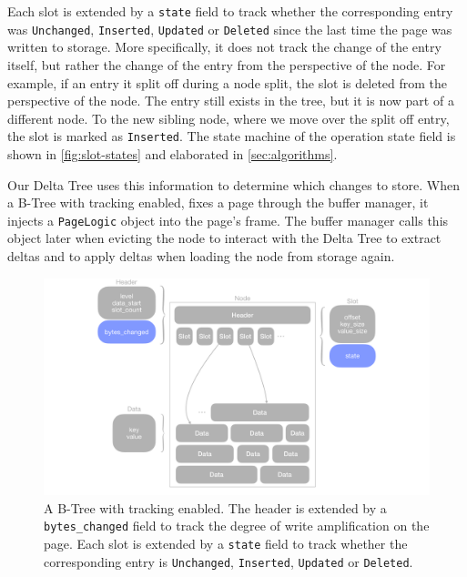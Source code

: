 Each slot is extended by a \texttt{state} field to track whether the corresponding entry was \texttt{Unchanged}, \texttt{Inserted}, \texttt{Updated} or \texttt{Deleted} since the last time the page was written to storage.
More specifically, it does not track the change of the entry itself, but rather the change of the entry from the perspective of the node.
For example, if an entry it split off during a node split, the slot is deleted from the perspective of the node.
The entry still exists in the tree, but it is now part of a different node.
To the new sibling node, where we move over the split off entry, the slot is marked as \texttt{Inserted}.
The state machine of the operation state field is shown in \autoref{fig:slot-states} and elaborated in \autoref{sec:algorithms}.

Our Delta Tree uses this information to determine which changes to store.
When a B-Tree with tracking enabled, fixes a page through the buffer manager, it injects a \texttt{PageLogic} object into the page's frame.
The buffer manager calls this object later when evicting the node to interact with the Delta Tree to extract deltas and to apply deltas when loading the node from storage again.

\begin{figure}[htbp]
  \centering
  \includegraphics[width=1\textwidth]{figures/b_tree_with_tracking.pdf}
  \caption{A B-Tree with tracking enabled. The header is extended by a \texttt{bytes\_changed} field to track the degree of write amplification on the page. Each slot is extended by a \texttt{state} field to track whether the corresponding entry is \texttt{Unchanged}, \texttt{Inserted}, \texttt{Updated} or \texttt{Deleted}.}
  \label{fig:b-tree-with-tracking}
\end{figure}

